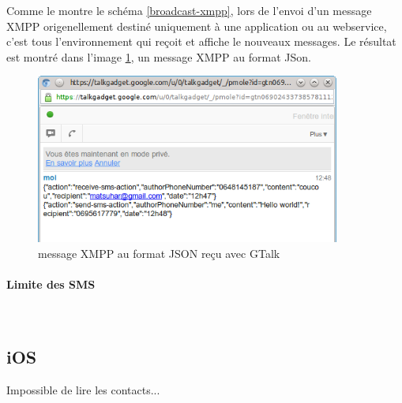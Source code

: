 Comme le montre le schéma \ref{broadcast-xmpp}, lors de l'envoi d'un message XMPP origenellement destiné uniquement
à une application ou au webservice, c'est tous l'environnement qui reçoit et affiche le nouveaux messages.
Le résultat est montré dans l'image \ref{message-xmpp-json-gmail}, un message XMPP au format JSon. 
	
\begin{figure}[!h]
	\center
	\includegraphics[width=10cm]{img/message-xmpp-json-gmail.png}
	\caption{message XMPP au format JSON reçu avec GTalk}
	\label{message-xmpp-json-gmail}
\end{figure}

\paragraph{Limite des SMS}

\\




\subsection{iOS}

Impossible de lire les contacts...
\\
